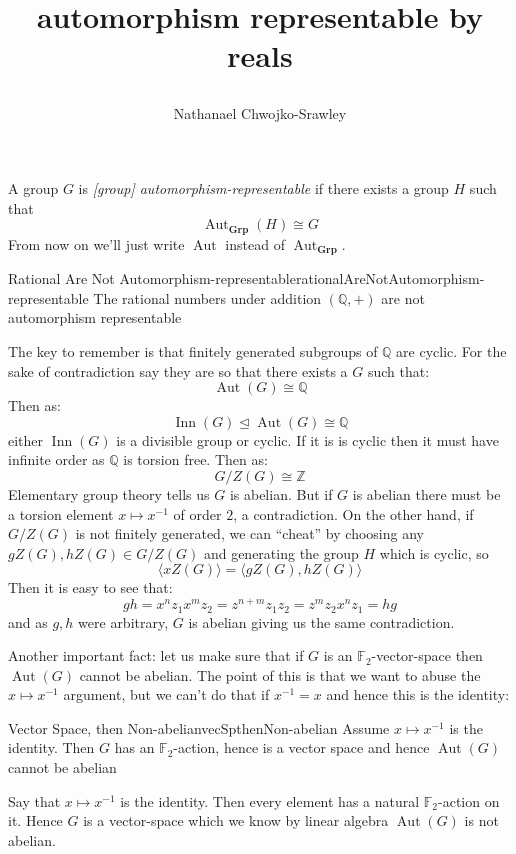 \documentclass{book}
\title{
	\begin{huge}
		\bf{automorphism representable by reals}
	\end{huge}
	}
\author{Nathanael Chwojko-Srawley}
\newcommand{\F}{{\mathbb{F}}}
\newcommand{\Q}{{\mathbb{Q}}}
\newcommand{\Z}{{\mathbb{Z}}}
\newcommand{\Grp}{{\textbf{Grp}}}
\newcommand{\Aut}{{\operatorname{Aut}}}
\newcommand{\Inn}{{\operatorname{Inn}}}
\newcommand{\nsubg}{\trianglelefteq}
\newenvironment{Proof}[1][]
  {\begin{ProofTcb}[#1]}
  {\end{ProofTcb}}
\begin{document}
\maketitle
\tableofcontents

A group $G$ is \emph{[group] automorphism-representable} if there exists a group $H$ such that
\[
  \Aut_\Grp(H) \cong G
\]
From now on we'll just write $\Aut$ instead of $\Aut_\Grp$.

\begin{lem}{Rational Are Not Automorphism-representable}{rationalAreNotAutomorphism-representable}
  The rational numbers under addition $(\Q, +)$ are not automorphism representable
\end{lem}

\begin{Proof}
  The key to remember is that finitely generated subgroups of $\Q$ are cyclic.
  For the sake of contradiction say they are so that there exists a $G$ such that:
  \[
    \Aut(G) \cong \Q
  \]
  Then as:
  \[
    \Inn(G) \nsubg \Aut(G) \cong \Q
  \]
  either $\Inn(G)$ is a divisible group or cyclic. If it is is cyclic then it must have infinite order as $\Q$
  is torsion free. Then as:
  \[
    G/Z(G) \cong \Z
  \]
  Elementary group theory tells us $G$ is abelian. But if $G$ is abelian there must be a torsion element
  $x \mapsto x^{-1}$ of order $2$, a contradiction. On the other hand, if $G/Z(G)$ is not finitely generated,
  we can ``cheat'' by choosing any $gZ(G), hZ(G) \in G/Z(G)$ and generating the group $H$ which is cyclic, so
  \[
    \langle xZ(G) \rangle = \langle gZ(G), hZ(G) \rangle
  \]
  Then it is easy to see that:
  \[
    gh = x^nz_1x^mz_2 = z^{n+m}z_1z_2 = z^mz_2x^nz_1 = hg
  \]
  and as $g,h$ were arbitrary, $G$ is abelian giving us the same contradiction.
\end{Proof}

Another important fact: let us make sure that if $G$ is an $\F_2$-vector-space then $\Aut(G)$ cannot be
abelian. The point of this is that we want to abuse the $x \mapsto x^{-1}$ argument, but we can't do that if
$x^{-1} = x$ and hence this is the identity:

\begin{lem}{Vector Space, then Non-abelian}{vecSpthenNon-abelian}
  Assume $x \mapsto x^{-1}$ is the identity. Then $G$ has an $\F_2$-action, hence is a vector space and hence
  $\Aut(G)$ cannot be abelian
\end{lem}

\begin{Proof}
  Say that $x \mapsto x^{-1}$ is the identity. Then every element has a natural $\F_2$-action on it. Hence $G$
  is a vector-space which we know by linear algebra $\Aut(G)$ is not abelian.
\end{Proof}
\end{document}
